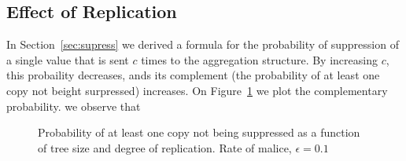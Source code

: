 \documentclass[11pt,twocolumn]{MyTightStyle}
\theoremstyle{plain}
\theoremstyle{definition}
\theoremstyle{remark}
\numberwithin{equation}{section}
\begin{document}
  \subsection{Effect of Replication}
  \label{sec:replicate}
  In Section~\ref{sec:supress} we derived a formula for the
  probability of suppression of a single value that is sent $c$ times
  to the aggregation structure. By increasing $c$, this probaility
  decreases, ands its complement (the probability of at least one copy
  not beight surpressed) increases. On Figure~\ref{fig:pb} we plot the
  complementary probability. we observe that 

  \begin{figure}[htpb!]
    \begin{center}
      \caption{\label{fig:pb} Probability of at least one copy not
      being suppressed as a function of tree size and degree of
      replication. Rate of malice, $\epsilon=0.1$}
    \end{center}
  \end{figure}
  

  
  
  




\end{document}
